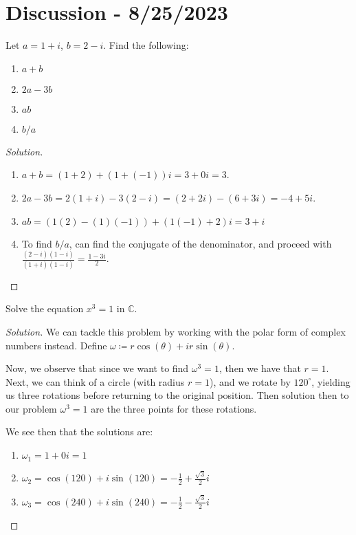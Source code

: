 \documentclass[openany]{book}
\newenvironment{solution}{\begin{proof}[Solution]}{\end{proof}}
\newcommand{\CC}{\mathbb{C}}
\begin{document}
	\section{Discussion - 8/25/2023}
	\begin{hw}
		Let $a = 1+i$, $b=2-i$. Find the following:
		\begin{enumerate}
			\item $a + b$
			\item $2a-3b$
			\item $ab$
			\item $b/a$
		\end{enumerate}
	\end{hw}
	\begin{solution}
		\begin{enumerate}
			\item $a + b = (1+2) + (1 + (-1))i = 3 + 0i = 3$.
			\item $2a-3b = 2(1+i) - 3(2-i) = (2+2i) - (6 + 3i) = -4 + 5i$.
			\item $ab = (1(2) - (1)(-1)) + (1(-1) + 2)i = 3 + i$ 
			\item To find $b/a$, can find the conjugate of the denominator, and proceed with $\frac{(2-i)(1-i)}{(1+i)(1-i)} = \frac{1 -3i}{2}$.
		\end{enumerate}
	\end{solution}
	
	\begin{hw}
		Solve the equation $x^{3} = 1$ in $\CC$.
	\end{hw}
	\begin{solution}
		We can tackle this problem by working with the polar form of complex numbers instead. Define $\omega \coloneq r\cos(\theta) + ir\sin(\theta)$.
		
		Now, we observe that since we want to find $\omega^{3} = 1$, then we have that $r=1$. Next, we can think of a circle (with radius $r = 1$), and we rotate by $120^{\circ}$, yielding us three rotations before returning to the original position. Then solution then to our problem $\omega^{3} = 1$ are the three points for these rotations.
		
		We see then that the solutions are:
		\begin{enumerate}
			\item $\omega_{1} = 1 + 0i = 1$
			\item $\omega_{2} = \cos(120) + i\sin(120) = -\frac{1}{2} + \frac{\sqrt{3}}{2}i$ 
			\item $\omega_{3} = \cos(240) + i\sin(240) = -\frac{1}{2} - \frac{\sqrt{3}}{2}i$
		\end{enumerate}
	\end{solution}
	
\end{document}
